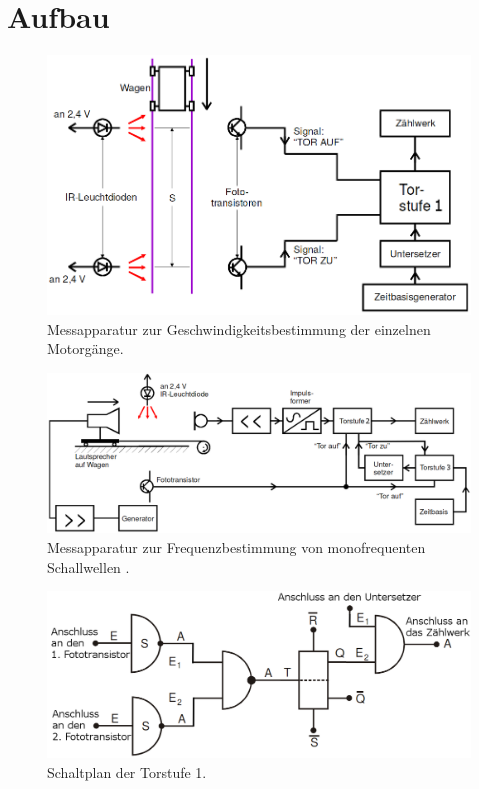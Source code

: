 \section{Aufbau}
\label{sec:Aufbau}
\begin{figure}
	\centering
	\includegraphics[width=\linewidth-50pt,height=\textheight-50pt,keepaspectratio]{content/Bilder/Geschwindigkeitsmessung.png}
	\caption{Messapparatur zur Geschwindigkeitsbestimmung der einzelnen Motorgänge\cite{V104}.}
	\label{fig:Aufbau}
\end{figure}
\begin{figure}
	\centering
	\includegraphics[width=\linewidth-50pt,height=\textheight-50pt,keepaspectratio]{content/Bilder/Frequenzmessung.png}
	\caption{Messapparatur zur Frequenzbestimmung von monofrequenten Schallwellen \cite{V104}.}
	\label{fig:Aufbau2}
\end{figure}
\begin{figure}
	\centering
	\includegraphics[width=\linewidth-50pt,height=\textheight-50pt,keepaspectratio]{content/Bilder/Torstufe1.png}
	\caption{Schaltplan der Torstufe 1.}
	\label{fig:Aufbasteve}
\end{figure}
